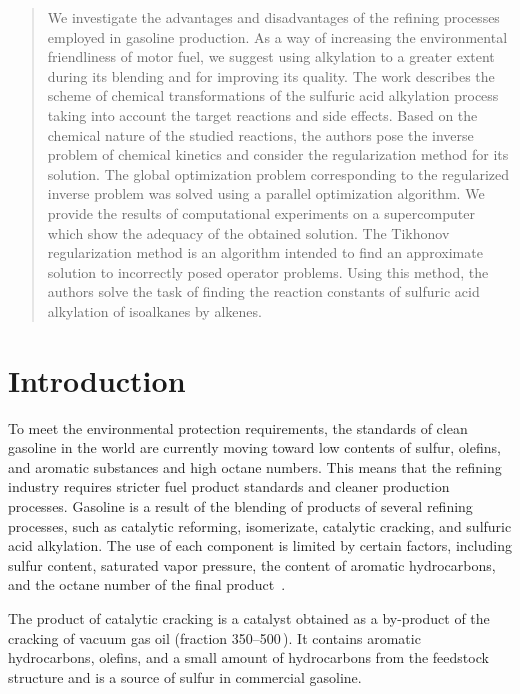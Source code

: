 \documentclass{svproc}
\begin{document}
\begin{abstract}
We investigate the advantages and disadvantages of the refining processes employed in gasoline production.
As a way of increasing the environmental friendliness of motor fuel, we suggest using alkylation to a greater extent during its blending and for improving its quality.
The work describes the scheme of chemical transformations of the sulfuric acid alkylation process taking into account the target reactions and side effects. Based on the chemical nature of the studied reactions, the authors pose the inverse problem of chemical kinetics and consider the regularization method for its solution.
The global optimization problem corresponding to the regularized inverse problem was solved using a parallel optimization algorithm.
We provide the results of computational experiments on a supercomputer which show the adequacy of the obtained solution. The Tikhonov regularization method is an algorithm intended to find an approximate solution to incorrectly posed operator problems. Using this method, the authors solve the task of finding the reaction constants of sulfuric acid alkylation of isoalkanes by alkenes.

\end{abstract}

\section{Introduction}
%
To meet the environmental protection requirements, the standards of clean gasoline in the world are currently moving toward low contents of sulfur, olefins, and aromatic substances and high octane numbers. This means that the refining industry requires stricter fuel product standards and cleaner production processes. Gasoline is a result of the blending of products of several refining processes, such as catalytic reforming, isomerizate, catalytic cracking, and sulfuric acid alkylation. The use of each component is limited by certain factors, including sulfur content, saturated vapor pressure, the content of aromatic hydrocarbons, and the octane number of the final product~\cite{alkylation_mod}.

The product of catalytic cracking is a catalyst obtained as a by-product of the cracking of vacuum gas oil (fraction 350--500\,\textcelsius). It contains aromatic hydrocarbons, olefins, and a small amount of hydrocarbons from the feedstock structure and is a source of sulfur in commercial gasoline.
\end{document}
